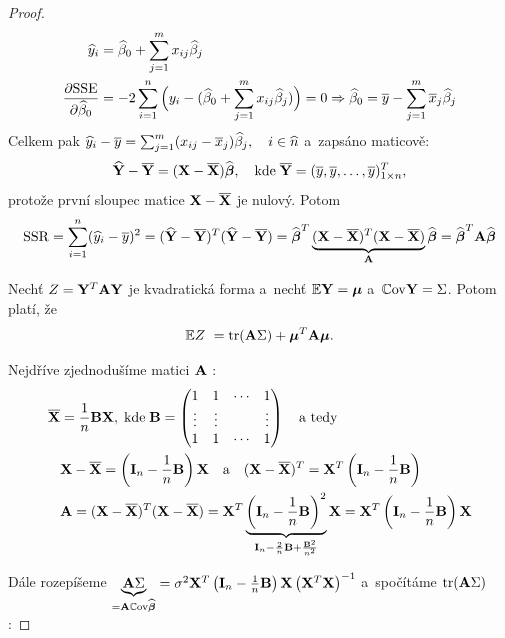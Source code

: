 \begin{proof}
	
\begin{align*}
	\hyi & = \wbeta_0 + \sumjm x_{ij} \wbeta_j \\
	\frac{\partial \SSE}{\partial \wbeta_0} & = -2\sumin \Big(y_i - (\wbeta_0 + \sumjm x_{ij} \wbeta_j) \Big) = 0 \Rightarrow \wbeta_0 = \ly - \sumjm \lx_j \wbeta_j
\end{align*}
Celkem pak $\hy_i - \ly = \sumjm (x_{ij} - \lx_j) \wbeta_j, \quad i\in\widehat{n} $ a~zapsáno maticově:
 $$
\hYb - \lYb = (\X - \lX) \wbetab, \quad \text{kde} \; \lYb = (\ly, \ly,\dots, \ly)_{1 \times n}^T,
 $$
protože první sloupec matice $\X - \lX$ je nulový. Potom
 $$
\SSR = \sumin (\hy_i - \ly)^2 = (\hYb - \lYb)^T(\hYb - \lYb) = \wbetab^T \underbrace{(\X - \lX)^T(\X - \lX)}_{\Am} \wbetab = \wbetab^T \Am \wbetab
 $$

\begin{theorem}
	Nechť $Z = \Y^T \Am \Y$ je kvadratická forma a~nechť $\E \Y = \bmu$ a~$\Cov \Y = \Sigma$. Potom platí, že
	 $$
		\E Z~ = \trace(\Am \Sigma) + \bmu^T \Am \bmu.
	 $$
\end{theorem}

Nejdříve zjednodušíme matici $\Am$ :
\begin{align*}
	\lX & = \frac{1}{n} \Bm \X, \; \text{kde} \; \Bm = \begin{pmatrix}
	1 & 1 & \cdots & 1 \\
	\vdots & \vdots & & \vdots \\
	1 & 1 & \cdots & 1
	\end{pmatrix} \quad \text{a tedy} \\
	& \X - \lX = \left(\Identita{n} - \frac{1}{n} \Bm \right) \X \quad \text{a} \quad (\X - \lX)^T = \X^T \left(\Identita{n} - \frac{1}{n} \Bm \right) \\
	& \Am = (\X - \lX)^T(\X - \lX) = \X^T \underbrace{\left(\Identita{n} - \frac{1}{n} \Bm \right)^2}_{\Identita{n} - \frac{2}{n} \Bm + \frac{\Bm^2}{n^2}} \X = \X^T \left(\Identita{n} - \frac{1}{n} \Bm \right) \X
\end{align*}

Dále rozepíšeme $\underbrace{\Am \Sigma}_{ = \Am \Cov \wbetab} = \sigma^2 \X^T \left(\Identita{n} - \frac{1}{n} \Bm \right) \X \left(\X^T \X \right)^{-1}$ a~spočítáme $\trace (\Am \Sigma)$ :


\end{proof}
